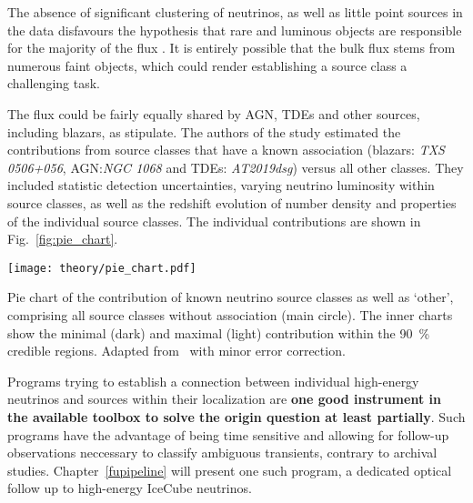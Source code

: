 The absence of significant clustering of neutrinos, as well as little point sources in the data disfavours the hypothesis that rare and luminous objects are responsible for the majority of the flux . It is entirely possible that the bulk flux stems from numerous faint objects, which could render establishing a source class a challenging task.

The flux could be fairly equally shared by AGN, TDEs and other sources, including blazars, as  stipulate. The authors of the study estimated the contributions from source classes that have a known association (blazars: \emph{TXS 0506+056}, AGN:\@ \emph{NGC 1068} and TDEs: \emph{AT2019dsg}) versus all other classes. They included statistic detection uncertainties, varying neutrino luminosity within source classes, as well as the redshift evolution of number density and properties of the individual source classes. The individual contributions are shown in Fig.~\ref{fig:pie_chart}.

\begin{marginfigure}
    \texttt{[image: theory/pie\_chart.pdf]}
    \caption[Neutrino flux contribution pie chart]{Pie chart of the contribution of known neutrino source classes as well as `other', comprising all source classes without association (main circle). The inner charts show the minimal (dark) and maximal (light) contribution within the \SI{90}{\percent} credible regions. Adapted from~\cite{Bartos2021} with minor error correction.}
\end{marginfigure}

Programs trying to establish a connection between individual high-energy neutrinos and sources within their localization are \textbf{one good instrument in the available toolbox to solve the origin question at least partially}. Such programs have the advantage of being time sensitive and allowing for follow-up observations neccessary to classify ambiguous transients, contrary to archival studies. Chapter~\ref{fupipeline} will present one such program, a dedicated optical follow up to high-energy IceCube neutrinos.


